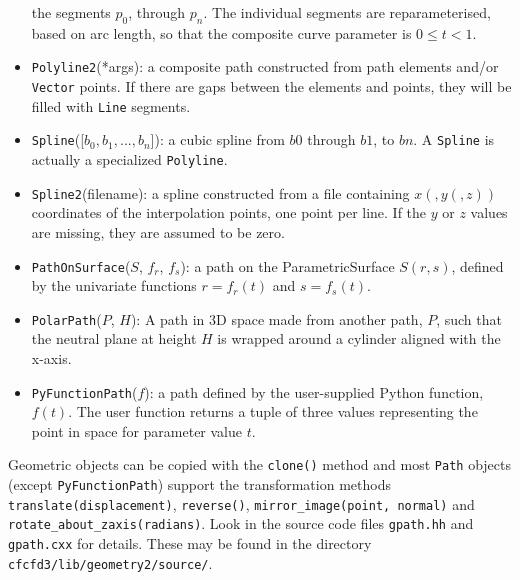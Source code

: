 \begin{itemize}
  the segments $p_0$, through $p_n$.
  The individual segments are reparameterised, based on arc length, so that
  the composite curve parameter is $0 \le t < 1$.
\item \texttt{Polyline2}(*args): a composite path constructed from path elements and/or \texttt{Vector} points.
  If there are gaps between the elements and points, 
  they will be filled with \texttt{Line} segments.
\item \texttt{Spline}([$b_0, b_1, ..., b_n$]): a cubic spline from $b0$ through
  $b1$, to $bn$.
  A \texttt{Spline} is actually a specialized \texttt{Polyline}.
\item \texttt{Spline2}(filename): a spline constructed from a file containing $x(,y(,z))$ coordinates
  of the interpolation points, one point per line.
  If the $y$ or $z$ values are missing, they are assumed to be zero.
\item \texttt{PathOnSurface}($S$, $f_r$, $f_s$): a path on the
  ParametricSurface $S(r,s)$, defined by the univariate functions 
  $r=f_r(t)$ and $s=f_s(t)$.
\item \texttt{PolarPath}($P$, $H$): A path in 3D space made from another path, $P$,
  such that the neutral plane at height $H$ is wrapped around a cylinder aligned with
  the x-axis.
\item \texttt{PyFunctionPath}($f$): a path defined by the user-supplied Python function, $f(t)$.
  The user function returns a tuple of three values representing the point in space 
  for parameter value $t$.
\end{itemize}

Geometric objects can be copied with the \texttt{clone()} method and
most \texttt{Path} objects (except \texttt{PyFunctionPath}) support the transformation methods
\texttt{translate(displacement)}, 
\texttt{reverse()}, 
\texttt{mirror\_image(point, normal)} and \\
\texttt{rotate\_about\_zaxis(radians)}.
Look in the source code files \texttt{gpath.hh} and \texttt{gpath.cxx} for details.
These may be found in the directory \texttt{cfcfd3/lib/geometry2/source/}.

